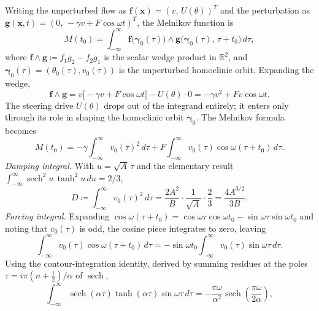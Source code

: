\documentclass[11pt, a4paper]{article}
\newcommand{\sech}{\operatorname{sech}}
\begin{document}
Writing the unperturbed flow as $\mathbf{f}(\mathbf{x}) = (v,\,U(\theta))^T$
and the perturbation as $\mathbf{g}(\mathbf{x}, t) = (0,\,-\gamma v +
F\cos\omega t)^T$, the Melnikov function is
\cite[\S4.5]{guckenheimer1983}
%
\begin{equation}
\label{eq:melnikov-def}
M(t_0)
  = \int_{-\infty}^{\infty}
    \mathbf{f}\bigl(\boldsymbol{\gamma}_0(\tau)\bigr)
    \wedge
    \mathbf{g}\bigl(\boldsymbol{\gamma}_0(\tau),\, \tau + t_0\bigr)
    \,d\tau,
\tag{26}
\end{equation}
%
where $\mathbf{f} \wedge \mathbf{g} \coloneqq f_1 g_2 - f_2 g_1$ is the scalar
wedge product in $\mathbb{R}^2$, and $\boldsymbol{\gamma}_0(\tau) =
(\theta_0(\tau), v_0(\tau))$ is the unperturbed homoclinic orbit.  Expanding the
wedge,
%
\begin{equation}
\label{eq:wedge-expand}
\mathbf{f} \wedge \mathbf{g}
  = v\bigl[-\gamma v + F\cos\omega t\bigr] - U(\theta)\cdot 0
  = -\gamma v^2 + Fv\cos\omega t.
\tag{27}
\end{equation}
%
The steering drive $U(\theta)$ drops out of the integrand entirely; it enters
only through its role in shaping the homoclinic orbit $\boldsymbol{\gamma}_0$.
The Melnikov formula becomes
%
\begin{equation}
\label{eq:melnikov-split}
M(t_0)
  = -\gamma\int_{-\infty}^{\infty} v_0(\tau)^2\,d\tau
  + F\int_{-\infty}^{\infty} v_0(\tau)\cos\omega(\tau + t_0)\,d\tau.
\tag{28}
\end{equation}
%
\textit{Damping integral.}  With $u = \sqrt{A}\,\tau$ and the elementary result
$\int_{-\infty}^{\infty} \sech^2 u\,\tanh^2 u\,du = 2/3$,
%
\begin{equation}
\label{eq:D-integral}
D \coloneqq \int_{-\infty}^{\infty} v_0(\tau)^2\,d\tau
  = \frac{2A^2}{B}\cdot\frac{1}{\sqrt{A}}\cdot\frac{2}{3}
  = \frac{4A^{3/2}}{3B}.
\tag{29}
\end{equation}
%
\textit{Forcing integral.}  Expanding $\cos\omega(\tau + t_0) = \cos\omega\tau
\cos\omega t_0 - \sin\omega\tau\sin\omega t_0$ and noting that $v_0(\tau)$ is
odd, the cosine piece integrates to zero, leaving
%
\begin{equation}
\label{eq:F-integral-setup}
\int_{-\infty}^{\infty} v_0(\tau)\cos\omega(\tau + t_0)\,d\tau
  = -\sin\omega t_0
    \int_{-\infty}^{\infty} v_0(\tau)\sin\omega\tau\,d\tau.
\end{equation}
%
Using the contour-integration identity, derived by summing residues at the poles
$\tau = i\pi(n + \tfrac{1}{2})/\alpha$ of $\sech$,
%
\begin{equation}
\label{eq:contour}
\int_{-\infty}^{\infty}
  \sech(\alpha\tau)\tanh(\alpha\tau)\sin\omega\tau\,d\tau
  = -\frac{\pi\omega}{\alpha^2}\sech\left(\frac{\pi\omega}{2\alpha}\right),
\end{equation}
\end{document}
